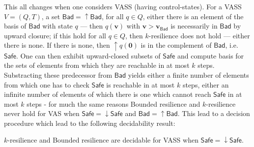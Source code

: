 \documentclass[runningheads]{llncs}
\newcommand{\Bad}{\textsf{Bad}}
\newcommand{\Safe}{\textsf{Safe}}
\begin{document}
This all changes when one considers VASS (having control-states). For a VASS $V = (Q,T)$, a set $\Bad = \mathop{\uparrow} \Bad$, for all $q \in Q$, either there is an element of the basis of $\Bad$ with state $q$ \----
then $q(\textbf{v})$ with $\textbf{v} > \textbf{v}_{\Bad}$ is necessarily in $\Bad$ by upward closure; if this hold for all $q \in Q$, then $k$-resilience does not hold \---- either there is none. If there is none, then 
$\mathop{\uparrow} q(\textbf{0})$
 is in the complement of $\Bad$, i.e. $\Safe$. One can then exhibit upward-closed subsets of 
 $\Safe$ and compute basis for the sets of elements from which they are reachable in at most $k$ steps. 
Substracting these predecessor from $\Bad$ yields either a finite number of elements from which one has to check $\Safe$ is reachable in at most $k$ steps, either an infinite number of elements of which there is one which cannot reach $\Safe$ in at most $k$ steps \-- for much the same reasons {\sc Bounded resilience} and {\sc $k$-resilience} never hold for VAS when $\Safe = \mathop{\downarrow} \Safe$ and $\Bad = \mathop{\uparrow} \Bad$. This lead to a decision procedure
 which lead to the following decidability result:
\begin{theorem}
{\sc $k$-resilience }  and {\sc Bounded resilience} are decidable for VASS when 
$\Safe = \mathop{\downarrow} \Safe$.
\end{theorem}
\end{document}

